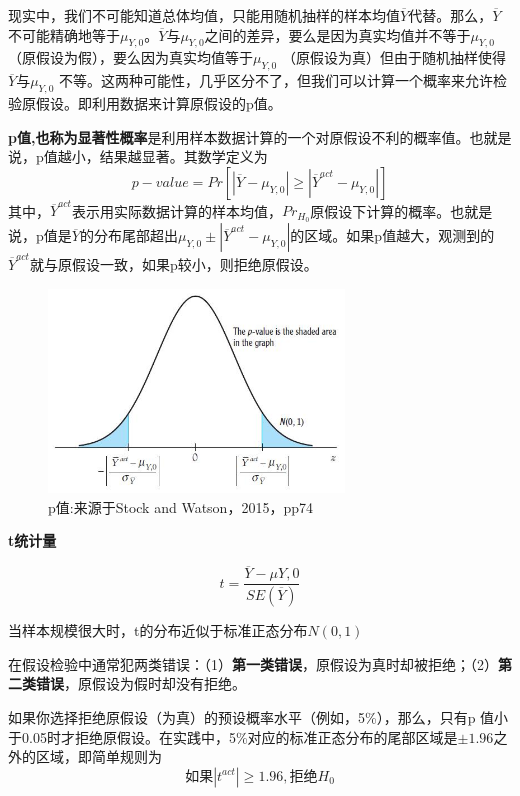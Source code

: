 \documentclass[cn,12pt,math=newtx,citestyle=gb7714-2015,bibstyle=gb7714-2015]{elegantbook}
\begin{document}
	现实中，我们不可能知道总体均值，只能用随机抽样的样本均值$\overline{Y}$代替。那么，$\overline{Y}$不可能精确地等于$\mu_{Y,0}$。$\overline{Y}$与$\mu_{Y,0}$之间的差异，要么是因为真实均值并不等于$\mu_{Y,0}$（原假设为假），要么因为真实均值等于$\mu_{Y,0}$ （原假设为真）但由于随机抽样使得$\overline{Y}$与$\mu_{Y,0}$ 不等。这两种可能性，几乎区分不了，但我们可以计算一个概率来允许检验原假设。即利用数据来计算原假设的p值。
	
	\textbf{p值,也称为显著性概率}是利用样本数据计算的一个对原假设不利的概率值。也就是说，p值越小，结果越显著。其数学定义为
	\begin{equation}
		p-value=Pr[|\overline{Y}-\mu_{Y,0}|\geq|\overline{Y}^{act}-\mu_{Y,0}|]
	\end{equation}
	其中，$\overline{Y}^{act}$表示用实际数据计算的样本均值，$Pr_{H_0}$原假设下计算的概率。也就是说，p值是$\overline{Y}$的分布尾部超出$\mu_{Y,0}\pm|\overline{Y}^{act}-\mu_{Y,0}|$的区域。如果p值越大，观测到的$\overline{Y}^{act}$就与原假设一致，如果p较小，则拒绝原假设。
	\begin{figure}[htbp]
		\centering
		\includegraphics[width=0.7\textwidth]{p.jpg}
		\caption{p值:来源于Stock and Watson，2015，pp74}\label{fig:digit}
	\end{figure}
	
	\textbf{t统计量}
	
	\begin{equation}
		t=\frac{\overline{Y}-\mu{Y,0}}{SE(\overline{Y})}
	\end{equation}
	
	当样本规模很大时，t的分布近似于标准正态分布$N(0,1)$
	
	在假设检验中通常犯两类错误：（1）\textbf{第一类错误}，原假设为真时却被拒绝；（2）\textbf{第二类错误}，原假设为假时却没有拒绝。
	
	如果你选择拒绝原假设（为真）的预设概率水平（例如，5\%），那么，只有p 值小于0.05时才拒绝原假设。在实践中，5\%对应的标准正态分布的尾部区域是$\pm1.96$之外的区域，即简单规则为
	\begin{equation}
		如果|t^{act}|\geq1.96,拒绝H_0
	\end{equation}
	
\end{document}
